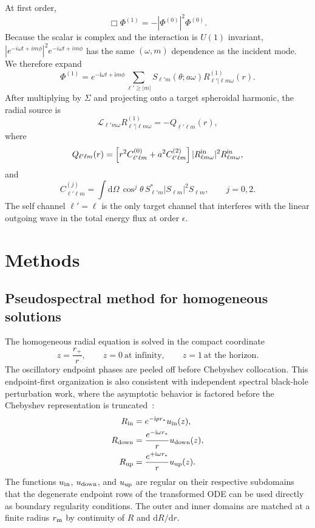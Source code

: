 \documentclass[aps,prd,twocolumn,10pt,nofootinbib,superscriptaddress,floatfix]{revtex4-2}
\newcommand{\dd}{\mathrm{d}}
\newcommand{\ii}{\mathrm{i}}
\newcommand{\rp}{r_+}
\begin{document}
At first order,
\begin{equation}
\Box\Phi^{(1)}=-|\Phi^{(0)}|^2\Phi^{(0)}.
\end{equation}
Because the scalar is complex and the interaction is $U(1)$ invariant,
$|e^{-i\omega t+im\phi}|^2e^{-i\omega t+im\phi}$ has the same
$(\omega,m)$ dependence as the incident mode.  We therefore expand
\begin{equation}
\Phi^{(1)}=e^{-\ii\omega t+\ii m\phi}
\sum_{\ell'\ge |m|}S_{\ell' m}(\theta;a\omega)
R^{(1)}_{\ell'|\ell m\omega}(r).
\end{equation}
After multiplying by $\Sigma$ and projecting onto a target spheroidal harmonic,
the radial source is
\begin{equation}
\mathcal L_{\ell'm\omega}R^{(1)}_{\ell'|\ell m\omega}
=-Q_{\ell'\ell m}(r),
\end{equation}
where
\begin{equation}
Q_{\ell'\ell m}(r)=
\left[r^2C^{(0)}_{\ell'\ell m}+a^2C^{(2)}_{\ell'\ell m}\right]
|R^{\rm in}_{\ell m\omega}|^2R^{\rm in}_{\ell m\omega},
\label{eq:source}
\end{equation}
and
\begin{equation}
C^{(j)}_{\ell'\ell m}
=\int \dd\Omega\,\cos^j\theta\,
S_{\ell'm}^*|S_{\ell m}|^2S_{\ell m},
\qquad j=0,2 .
\end{equation}
The self channel $\ell'=\ell$ is the only target channel that interferes with
the linear outgoing wave in the total energy flux at order $\epsilon$.

\section{Methods}
\label{sec:methods}

\subsection{Pseudospectral method for homogeneous solutions}

The homogeneous radial equation is solved in the compact coordinate
\begin{equation}
z=\frac{\rp}{r},\qquad z=0\ \text{at infinity},\qquad z=1\ \text{at the horizon}.
\end{equation}
The oscillatory endpoint phases are peeled off before Chebyshev collocation.
This endpoint-first organization is also
consistent with independent spectral black-hole perturbation work, where the
asymptotic behavior is factored before the Chebyshev representation is
truncated~\cite{ChungWagleYunes2023}:
\begin{align}
R_{\rm in}&=e^{-\ii p r_*}u_{\rm in}(z),\\
R_{\rm down}&=\frac{e^{-\ii\omega r_*}}{r}u_{\rm down}(z),\\
R_{\rm up}&=\frac{e^{+\ii\omega r_*}}{r}u_{\rm up}(z).
\end{align}
The functions $u_{\rm in}$, $u_{\rm down}$, and $u_{\rm up}$ are regular
on their respective subdomains that the degenerate endpoint rows of the
transformed ODE can be used directly as boundary regularity conditions.  The
outer and inner domains are matched at a finite radius $r_{\rm m}$ by continuity
of $R$ and $\dd R/\dd r$.
\end{document}
